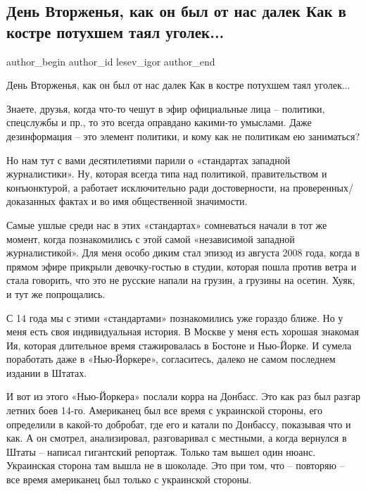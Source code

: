 
 
 
 
 
 
\subsection{День Вторженья, как он был от нас далек Как в костре потухшем таял уголек...}
\label{sec:16_02_2022.tg.lesev_igor.1.den_vtorzhenia}
 
\ifcmt
 author_begin
   author_id lesev_igor
 author_end
\fi

День Вторженья, как он был от нас далек Как в костре потухшем таял уголек...

Знаете, друзья, когда что-то чешут в эфир официальные лица – политики,
спецслужбы и пр., то это всегда оправдано какими-то умыслами. Даже
дезинформация – это элемент политики, и кому как не политикам ею заниматься?

Но нам тут с вами десятилетиями парили о «стандартах западной журналистики».
Ну, которая всегда типа над политикой, правительством и конъюнктурой, а
работает исключительно ради достоверности, на проверенных/доказанных фактах и
во имя общественной значимости.

Самые ушлые среди нас в этих «стандартах» сомневаться начали в тот же момент,
когда познакомились с этой самой «независимой западной журналистикой». Для меня
особо диким стал эпизод из августа 2008 года, когда в прямом эфире прикрыли
девочку-гостью в студии, которая пошла против ветра и стала говорить, что это
не русские напали на грузин, а грузины на осетин. Хуяк, и тут же попрощались.

С 14 года мы с этими «стандартами» познакомились уже гораздо ближе. Но у меня
есть своя индивидуальная история. В Москве у меня есть хорошая знакомая Ия,
которая длительное время стажировалась в Бостоне и Нью-Йорке. И сумела
поработать даже в «Нью-Йоркере», согласитесь, далеко не самом последнем издании
в Штатах.

И вот из этого «Нью-Йоркера» послали корра на Донбасс. Это как раз был разгар
летних боев 14-го. Американец был все время с украинской стороны, его
определили в какой-то добробат, где его и катали по Донбассу, показывая что и
как. А он смотрел, анализировал, разговаривал с местными, а когда вернулся в
Штаты – написал гигантский репортаж. Только там вышел один нюанс. Украинская
сторона там вышла не в шоколаде. Это при том, что – повторяю – все время
американец был только с украинской стороны.

